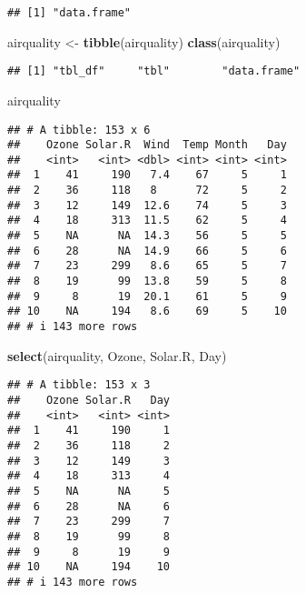\documentclass[
]{article}
\newenvironment{Shaded}{\begin{snugshade}}{\end{snugshade}}
\newcommand{\FunctionTok}[1]{\textcolor[rgb]{0.13,0.29,0.53}{\textbf{#1}}}
\newcommand{\NormalTok}[1]{#1}
\newcommand{\OtherTok}[1]{\textcolor[rgb]{0.56,0.35,0.01}{#1}}
\begin{document}
\begin{verbatim}
## [1] "data.frame"
\end{verbatim}

\begin{Shaded}
\begin{Highlighting}[]
\NormalTok{airquality }\OtherTok{\textless{}{-}} \FunctionTok{tibble}\NormalTok{(airquality)}
\FunctionTok{class}\NormalTok{(airquality)}
\end{Highlighting}
\end{Shaded}

\begin{verbatim}
## [1] "tbl_df"     "tbl"        "data.frame"
\end{verbatim}

\begin{Shaded}
\begin{Highlighting}[]
\NormalTok{airquality}
\end{Highlighting}
\end{Shaded}

\begin{verbatim}
## # A tibble: 153 x 6
##    Ozone Solar.R  Wind  Temp Month   Day
##    <int>   <int> <dbl> <int> <int> <int>
##  1    41     190   7.4    67     5     1
##  2    36     118   8      72     5     2
##  3    12     149  12.6    74     5     3
##  4    18     313  11.5    62     5     4
##  5    NA      NA  14.3    56     5     5
##  6    28      NA  14.9    66     5     6
##  7    23     299   8.6    65     5     7
##  8    19      99  13.8    59     5     8
##  9     8      19  20.1    61     5     9
## 10    NA     194   8.6    69     5    10
## # i 143 more rows
\end{verbatim}

\begin{Shaded}
\begin{Highlighting}[]
\FunctionTok{select}\NormalTok{(airquality, Ozone, Solar.R, Day)}
\end{Highlighting}
\end{Shaded}

\begin{verbatim}
## # A tibble: 153 x 3
##    Ozone Solar.R   Day
##    <int>   <int> <int>
##  1    41     190     1
##  2    36     118     2
##  3    12     149     3
##  4    18     313     4
##  5    NA      NA     5
##  6    28      NA     6
##  7    23     299     7
##  8    19      99     8
##  9     8      19     9
## 10    NA     194    10
## # i 143 more rows
\end{verbatim}
\end{document}
